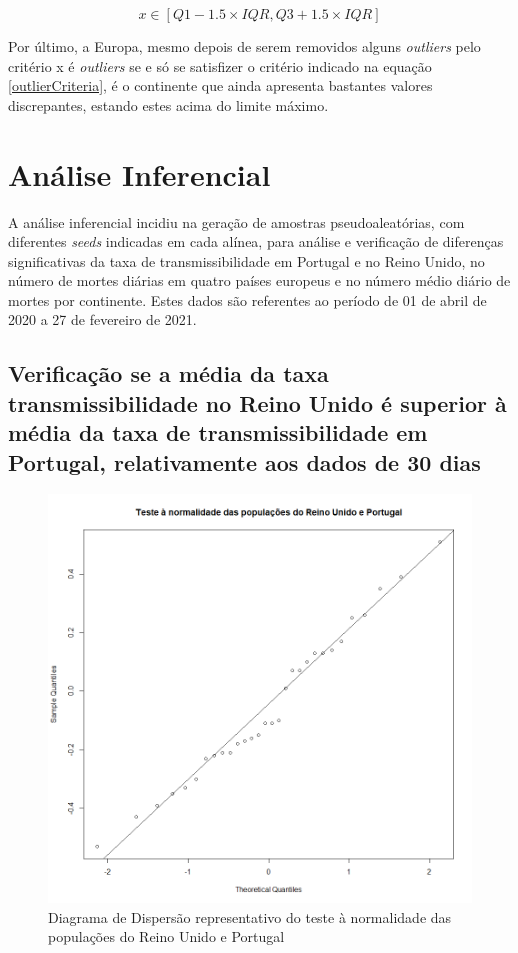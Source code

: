 \documentclass[conference]{IEEEtran}
\begin{document}
\begin{equation}
x\in [Q1-1.5\times IQR, Q3+1.5\times IQR]\label{outlierCriteria}
\end{equation}

Por último, a Europa, mesmo depois de serem removidos alguns \textit{outliers} pelo critério x é \textit{outliers} se e só se satisfizer o critério indicado na equação \eqref{outlierCriteria}, é o continente que ainda apresenta bastantes valores discrepantes, estando estes acima do limite máximo.


\section{Análise Inferencial} %
A análise inferencial incidiu na geração de amostras pseudoaleatórias, com diferentes \textit{seeds} indicadas em cada alínea, para análise e verificação de diferenças significativas da taxa de transmissibilidade em Portugal e no Reino Unido, no número de mortes diárias em quatro países europeus e no número médio diário de mortes por continente. Estes dados são referentes ao período de 01 de abril de 2020 a 27 de fevereiro de 2021.

\subsection{Verificação se a média da taxa transmissibilidade no Reino Unido é superior à média da taxa de transmissibilidade em Portugal, relativamente aos dados de 30 dias}

\begin{figure}[htbp]
\centerline{\includegraphics[width=0.95\columnwidth]{images/02.a.png}}
\caption{Diagrama de Dispersão representativo do teste à normalidade das populações do Reino Unido e Portugal}
\label{2a}
\end{figure}
\end{document}

